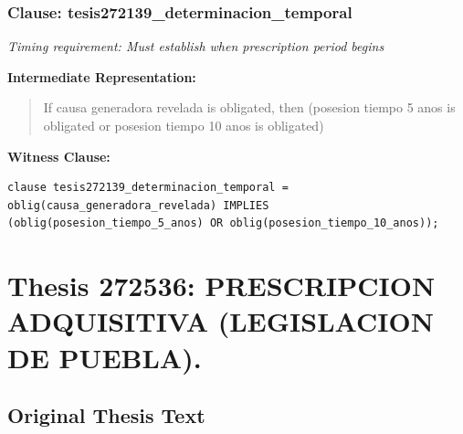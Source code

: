 \documentclass[11pt,a4paper]{article}
\begin{document}
\subsubsection{Clause: tesis272139\_determinacion\_temporal}

\textit{Timing requirement: Must establish when prescription period begins}

\textbf{Intermediate Representation:}

\begin{quote}
If causa generadora revelada is obligated, then (posesion tiempo 5 anos is obligated or posesion tiempo 10 anos is obligated)
\end{quote}

\textbf{Witness Clause:}

\begin{lstlisting}[style=witnessstyle, language=Witness]
clause tesis272139_determinacion_temporal = oblig(causa_generadora_revelada) IMPLIES (oblig(posesion_tiempo_5_anos) OR oblig(posesion_tiempo_10_anos));
\end{lstlisting}

\newpage

\section{Thesis 272536: PRESCRIPCION ADQUISITIVA (LEGISLACION DE PUEBLA).}
\label{thesis:272536}

\subsection{Original Thesis Text}
\end{document}
